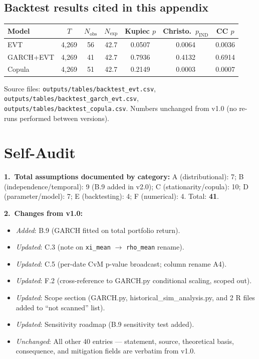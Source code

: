 \documentclass[11pt,a4paper]{article}
\newcommand{\code}[1]{\texttt{#1}}
\begin{document}
\subsection{Backtest results cited in this appendix}

\begin{center}
\begin{tabular}{@{}lcccccc@{}}
\toprule
\textbf{Model} & \textbf{$T$} & \textbf{$N_{\text{obs}}$} & \textbf{$N_{\text{exp}}$} &
\textbf{Kupiec $p$} & \textbf{Christo.\ $p_{\text{IND}}$} & \textbf{CC $p$} \\
\midrule
EVT            & 4{,}269 & 56 & 42.7 & 0.0507 & 0.0064 & 0.0036 \\
GARCH+EVT      & 4{,}269 & 41 & 42.7 & 0.7936 & 0.4132 & 0.6914 \\
Copula         & 4{,}269 & 51 & 42.7 & 0.2149 & 0.0003 & 0.0007 \\
\bottomrule
\end{tabular}
\end{center}

Source files: \code{outputs/tables/backtest\_evt.csv},
\code{outputs/tables/backtest\_garch\_evt.csv},
\code{outputs/tables/backtest\_copula.csv}.
Numbers unchanged from v1.0 (no re-runs performed between versions).

\section*{Self-Audit}\label{sec:audit}

\textbf{1.\ Total assumptions documented by category:}
A (distributional): 7; B (independence/temporal): 9 (B.9 added in v2.0);
C (stationarity/copula): 10; D (parameter/model): 7;
E (backtesting): 4; F (numerical): 4. Total: \textbf{41}.

\textbf{2.\ Changes from v1.0:}
\begin{itemize}
  \item \emph{Added}: B.9 (GARCH fitted on total portfolio return).
  \item \emph{Updated}: C.3 (note on \code{xi\_mean} $\to$ \code{rho\_mean} rename).
  \item \emph{Updated}: C.5 (per-date CvM p-value broadcast; column rename A4).
  \item \emph{Updated}: F.2 (cross-reference to GARCH.py conditional scaling,
    scoped out).
  \item \emph{Updated}: Scope section (GARCH.py, historical\_sim\_analysis.py,
    and 2 R files added to ``not scanned'' list).
  \item \emph{Updated}: Sensitivity roadmap (B.9 sensitivity test added).
  \item \emph{Unchanged}: All other 40 entries --- statement, source, theoretical
    basis, consequence, and mitigation fields are verbatim from v1.0.
\end{itemize}
\end{document}
